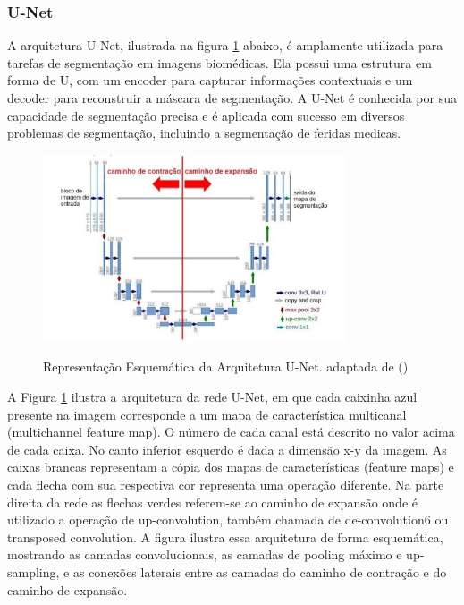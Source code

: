     
    \subsubsection{U-Net}

        A arquitetura \ac{U-Net}, ilustrada na figura \ref{fig:arquiteturaUNet} abaixo,  é amplamente utilizada para tarefas de segmentação em imagens biomédicas. Ela possui uma estrutura em forma de U, com um encoder para capturar informações contextuais e um decoder para reconstruir a máscara de segmentação. A \ac{U-Net} é conhecida por sua capacidade de segmentação precisa e é aplicada com sucesso em diversos problemas de segmentação, incluindo a segmentação de feridas medicas.

        \begin{figure}[htbp]
            \centering
             \caption{Representação Esquemática da Arquitetura \ac{U-Net}. adaptada de (\cite{ronneberger2015u})}
            \includegraphics[width=0.8\textwidth]{img/arquitetura_U-Net.png}
            \label{fig:arquiteturaUNet}
        \end{figure}

            A Figura \ref{fig:arquiteturaUNet} ilustra a arquitetura da rede \ac{U-Net}, em que cada caixinha azul presente na imagem corresponde a um mapa de característica multicanal (multichannel feature map). O número de cada canal está descrito no valor acima de cada caixa. No canto inferior esquerdo é dada a dimensão x-y da imagem. As caixas brancas representam a cópia dos mapas de características (feature maps) e cada flecha com sua respectiva cor representa uma operação diferente. Na parte direita da rede as flechas verdes referem-se ao caminho de expansão onde é utilizado a operação de up-convolution, também chamada de de-convolution6 ou transposed convolution. A figura ilustra essa arquitetura de forma esquemática, mostrando as camadas convolucionais, as camadas de pooling máximo e up-sampling, e as conexões laterais entre as camadas do caminho de contração e do caminho de expansão.


